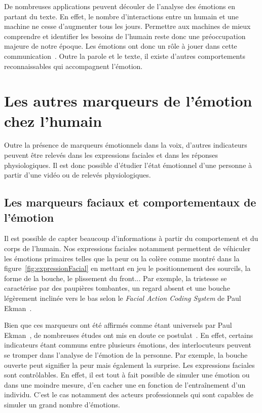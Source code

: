 De nombreuses applications peuvent découler de l'analyse des émotions en partant du texte. En effet, le nombre d’interactions entre un humain et une machine ne cesse d'augmenter tous les jours. Permettre aux machines de mieux comprendre et identifier les besoins de l'humain reste donc une préoccupation majeure de notre époque. Les émotions ont donc un rôle à jouer dans cette communication~\cite{Picard2000}. Outre la parole et le texte, il existe d'autres comportements reconnaissables qui accompagnent l'émotion.

\section{Les autres marqueurs de l'émotion chez l'humain}
Outre la présence de marqueurs émotionnels dans la voix, d'autres indicateurs peuvent être relevés dans les expressions faciales et dans les réponses physiologiques. Il est donc possible d'étudier l'état émotionnel d'une personne à partir d'une vidéo ou de relevés physiologiques.

\subsection{Les marqueurs faciaux et comportementaux de l'émotion}


Il est possible de capter beaucoup d'informations à partir du comportement et du corps de l'humain. %
Nos expressions faciales notamment permettent de véhiculer les émotions primaires telles que la peur ou la colère comme montré dans la figure~\ref{fig:expressionFacial} en mettant en jeu le positionnement des sourcils, la forme de la bouche, le plissement du front...
Par exemple, la tristesse se caractérise par des paupières tombantes, un regard absent et une bouche légèrement inclinée vers le bas selon le \textit{Facial Action Coding System} de Paul Ekman~\cite{Ekman1978}.

Bien que ces marqueurs ont été affirmés comme étant universels par Paul Ekman~\cite{Ekman1978}, de nombreuses études ont mis en doute ce postulat~\cite{Leys2010,Gendron2014}. En effet, certains indicateurs étant communs entre plusieurs émotions, des interlocuteurs peuvent se tromper dans l'analyse de l'émotion de la personne. Par exemple, la bouche ouverte peut signifier la peur mais également la surprise. Les expressions faciales sont contrôlables. En effet, il est tout à fait possible de simuler une émotion ou dans une moindre mesure, d'en cacher une en fonction de l’entraînement d'un individu. C'est le cas notamment des acteurs professionnels qui sont capables de simuler un grand nombre d'émotions.


